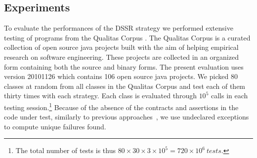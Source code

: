 \documentclass[conference]{IEEEtran}
\begin{document}
\subsection{Experiments}

To evaluate the performances of the DSSR strategy we performed extensive testing of programs from the Qualitas Corpus \cite{Tempero2010a}. The Qualitas Corpus is a curated collection of open source java projects built with the aim of helping empirical research on  software engineering. These projects are collected in an organized form containing both the source and binary forms. The present evaluation uses version 20101126 which contains 106 open source java projects. We picked 80 classes at random from all classes in the Qualitas Corpus and test each of them thirty times with each strategy.
Each class is evaluated through $10^5$ calls in each testing session.\footnote{The total number of tests is thus $80\times 30\times 3 \times 10^5 = 720\times 10^6~tests$.} 
Because of the absence of the contracts and assertions in the code under test, similarly to previous approaches~\cite{Oriol2012}, we use undeclared exceptions to compute unique failures found.

%
%
%
\end{document}
